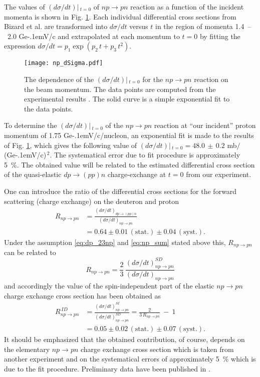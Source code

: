 \documentclass[twocolumn,epjc3]{svjour3}
\newcommand{\np}     {\ensuremath{np \rightarrow pn}\xspace}
\newcommand{\dpchex} {\ensuremath{dp \rightarrow (pp)n}\xspace}
\newcommand{\GeVc}   {Ge\kern-.1emV/c\xspace}
\begin{document}
The values of $(d\sigma/dt)|\,_{t=0}$ of \np reaction as a function of the
incident momenta is shown in Fig. \ref{fig:npsigma}. Each individual
differential cross sections from Bizard et al. \cite{biz75} are transformed into
$d\sigma/dt$ versus $t$ in the region of momenta 1.4~--~2.0 \GeVc and
extrapolated at each momentum to $t=0$ by fitting the expression
$d\sigma/dt = p_1\exp(p_2\,t + p_3\,t^2)$. %

\begin{figure}[h]
  \centering
  \texttt{[image: np\_dSigma.pdf]}
  \caption{The dependence of the $(d\sigma/dt)|\,_{t=0}$ for the \np reaction on
    the beam momentum. The data points are computed from the experimental
    results \cite{biz75}. The solid curve is a simple exponential fit to the
    data points.}
  \label{fig:npsigma}
\end{figure}

To determine the $(d\sigma/dt)|\,_{t=0}$ of the \np reaction at ``our incident''
proton momentum of 1.75 \GeVc/nucleon, an exponential fit is made to the results
of Fig. \ref{fig:npsigma}, which gives the following value of
$(d\sigma/dt)|\,_{t=0} = 48.0\,\pm\,0.2$ mb$/$(\GeVc)$^{\,2}$. The systematical
error due to fit procedure is approximately 5~\%. The obtained value will be
related to the estimated differential cross section of the quasi-elastic \dpchex
charge-exchange at $t=0$ from our experiment.

One can introduce the ratio of the differential cross sections for the forward
scattering (charge exchange) on the deuteron and proton
\begin{equation}
  \begin{split}
    R_{\np} &= \frac{(d\sigma/dt)_{\dpchex}}{(d\sigma/dt)_{\np}} \\
    &= 0.64 \pm 0.01\,\mathrm{(stat.)} \pm 0.04\,\mathrm{(syst.)}.
  \end{split}
\end{equation}
Under the assumption \eqref{eq:dp_23np} and \eqref{eq:np_sum} stated above this,
$R_{\np}$ can be related to
\begin{equation}
  R_{\np} = \frac{2}{3}\,\frac{(d\sigma/dt)^{SD}_{\np}}{(d\sigma/dt)_{\np}}
\end{equation}
and accordingly the value of the spin-independent part of the elastic \np charge
exchange cross section has been obtained as
\begin{equation}
  \begin{split}
    R^{\,ID}_{\np} &= \frac{(d\sigma/dt)^{SI}_{\np}}{(d\sigma/dt)^{SD}_{\np}}
    = \frac{2}{3\,R_{\np}} \ - \ 1 \\
    &= 0.05 \pm 0.02\,\mathrm{(stat.)} \pm 0.07\,\mathrm{(syst.)}.
  \end{split}
\end{equation}
It should be emphasized that the obtained contribution, of course, depends on
the elementary \np charge exchange cross section which is taken from another
experiment and on the systematical errors of approximately 5~\% which is due to
the fit procedure. Preliminary data have been published in \cite{bas14,bas16}.
\end{document}
